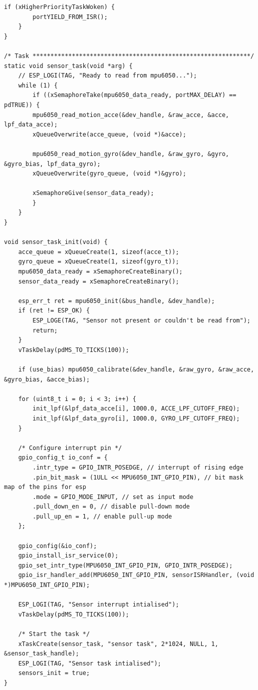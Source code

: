 \begin{lstlisting}[caption={sensors.c}]
    if (xHigherPriorityTaskWoken) {
        portYIELD_FROM_ISR();
    }
}

/* Task *************************************************************/
static void sensor_task(void *arg) {
    // ESP_LOGI(TAG, "Ready to read from mpu6050...");
    while (1) {
        if ((xSemaphoreTake(mpu6050_data_ready, portMAX_DELAY) == pdTRUE)) {
        mpu6050_read_motion_acce(&dev_handle, &raw_acce, &acce, lpf_data_acce);
        xQueueOverwrite(acce_queue, (void *)&acce);

        mpu6050_read_motion_gyro(&dev_handle, &raw_gyro, &gyro, &gyro_bias, lpf_data_gyro);
        xQueueOverwrite(gyro_queue, (void *)&gyro);

        xSemaphoreGive(sensor_data_ready); 
        }
    }
}

void sensor_task_init(void) {
    acce_queue = xQueueCreate(1, sizeof(acce_t));
    gyro_queue = xQueueCreate(1, sizeof(gyro_t));
    mpu6050_data_ready = xSemaphoreCreateBinary();
    sensor_data_ready = xSemaphoreCreateBinary();

    esp_err_t ret = mpu6050_init(&bus_handle, &dev_handle);
    if (ret != ESP_OK) {
        ESP_LOGE(TAG, "Sensor not present or couldn't be read from");
        return;
    }
    vTaskDelay(pdMS_TO_TICKS(100)); 

    if (use_bias) mpu6050_calibrate(&dev_handle, &raw_gyro, &raw_acce, &gyro_bias, &acce_bias);

    for (uint8_t i = 0; i < 3; i++) {
        init_lpf(&lpf_data_acce[i], 1000.0, ACCE_LPF_CUTOFF_FREQ);
        init_lpf(&lpf_data_gyro[i], 1000.0, GYRO_LPF_CUTOFF_FREQ);
    }

    /* Configure interrupt pin */
    gpio_config_t io_conf = {
        .intr_type = GPIO_INTR_POSEDGE, // interrupt of rising edge
        .pin_bit_mask = (1ULL << MPU6050_INT_GPIO_PIN), // bit mask map of the pins for esp
        .mode = GPIO_MODE_INPUT, // set as input mode
        .pull_down_en = 0, // disable pull-down mode
        .pull_up_en = 1, // enable pull-up mode
    };
    
    gpio_config(&io_conf);
    gpio_install_isr_service(0);
    gpio_set_intr_type(MPU6050_INT_GPIO_PIN, GPIO_INTR_POSEDGE);
    gpio_isr_handler_add(MPU6050_INT_GPIO_PIN, sensorISRHandler, (void *)MPU6050_INT_GPIO_PIN);

    ESP_LOGI(TAG, "Sensor interrupt intialised");
    vTaskDelay(pdMS_TO_TICKS(100)); 

    /* Start the task */
    xTaskCreate(sensor_task, "sensor task", 2*1024, NULL, 1, &sensor_task_handle);
    ESP_LOGI(TAG, "Sensor task intialised");
    sensors_init = true; 
}


\end{lstlisting}
